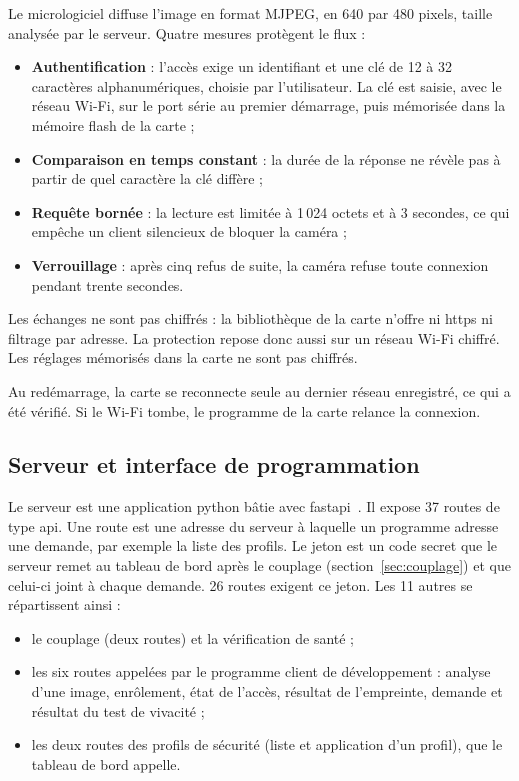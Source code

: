 Le micrologiciel diffuse l'image en format MJPEG, en 640 par 480 pixels, taille analysée par le serveur. Quatre mesures protègent le flux :
\begin{itemize}
  \item \textbf{Authentification} : l'accès exige un identifiant et une clé de 12 à 32 caractères alphanumériques, choisie par l'utilisateur. La clé est saisie, avec le réseau Wi-Fi, sur le port série au premier démarrage, puis mémorisée dans la mémoire flash de la carte ;
  \item \textbf{Comparaison en temps constant} : la durée de la réponse ne révèle pas à partir de quel caractère la clé diffère ;
  \item \textbf{Requête bornée} : la lecture est limitée à 1\,024 octets et à 3 secondes, ce qui empêche un client silencieux de bloquer la caméra ;
  \item \textbf{Verrouillage} : après cinq refus de suite, la caméra refuse toute connexion pendant trente secondes.
\end{itemize}
Les échanges ne sont pas chiffrés : la bibliothèque de la carte n'offre ni \gls{https} ni filtrage par adresse. La protection repose donc aussi sur un réseau Wi-Fi chiffré. Les réglages mémorisés dans la carte ne sont pas chiffrés. \begin{maj}
Au redémarrage, la carte se reconnecte seule au dernier réseau enregistré, ce qui a été vérifié. Si le Wi-Fi tombe, le programme de la carte relance la connexion.
\end{maj}

\subsection{Serveur et interface de programmation}\label{sec:routes}

Le serveur est une application \gls{python} bâtie avec \gls{fastapi}~\cite{fastapi_docs}. Il expose 37 routes de type \gls{api}. Une route est une adresse du serveur à laquelle un programme adresse une demande, par exemple la liste des profils. Le jeton est un code secret que le serveur remet au tableau de bord après le couplage (section~\ref{sec:couplage}) et que celui-ci joint à chaque demande. 26 routes exigent ce jeton. Les 11 autres se répartissent ainsi :
\begin{itemize}
  \item le couplage (deux routes) et la vérification de santé ;
  \item les six routes appelées par le programme client de développement : analyse d'une image, enrôlement, état de l'accès, résultat de l'empreinte, demande et résultat du test de vivacité ;
  \item les deux routes des profils de sécurité (liste et application d'un profil), que le tableau de bord appelle.
\end{itemize}

